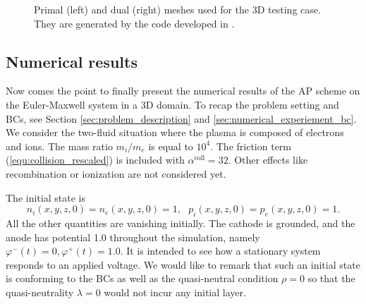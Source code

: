 \documentclass{article}
\begin{document}
\begin{figure}
    \centering
    \hspace{2cm}
    \caption{Primal (left) and dual (right) meshes used for the 3D testing case. They are generated by the code developed in \cite{fuchs_2021}.}
    \label{fig:primal_dual_meshes}
\end{figure}

\subsection{Numerical results}
Now comes the point to finally present the numerical results of the AP scheme on the Euler-Maxwell system in a 3D domain. To recap the problem setting and BCs, see Section \ref{sec:problem_description} and \ref{sec:numerical_experiement_bc}. We consider the two-fluid situation where the plasma is composed of electrons and ions. The mass ratio $m_i / m_e$ is equal to $10^4$. The friction term (\ref{equ:collision_rescaled}) is included with $\alpha^\text{coll} = 32$. Other effects like recombination or ionization are not considered yet.  

The initial state is
\begin{equation*}
    n_i(x,y,z,0) = n_e(x,y,z,0) = 1, \ \ \  p_i(x,y,z,0) = p_e(x,y,z,0) = 1.
\end{equation*}
All the other quantities are vanishing initially. The cathode is grounded, and the anode has potential 1.0 throughout the simulation, namely $\varphi^-(t) = 0, \varphi^+(t) = 1.0$. It is intended to see how a stationary system responds to an applied voltage. We would like to remark that such an initial state is conforming to the BCs as well as the quasi-neutral condition $\rho = 0$ so that the quasi-neutrality $\lambda  = 0$ would not incur any initial layer. 
\end{document}

